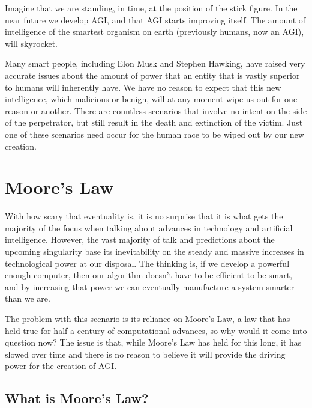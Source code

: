 \documentclass[12pt]{article} %
\begin{document}
Imagine that we are standing, in time, at the position of the stick figure. In the near future we develop AGI, and that AGI starts improving itself. The amount of intelligence of the smartest organism on earth (previously humans, now an AGI), will skyrocket.

Many smart people, including Elon Musk and Stephen Hawking, have raised very accurate issues about the amount of power that an entity that is vastly superior to humans will inherently have. We have no reason to expect that this new intelligence, which malicious or benign, will at any moment wipe us out for one reason or another. There are countless scenarios that involve no intent on the side of the perpetrator, but still result in the death and extinction of the victim. Just one of these scenarios need occur for the human race to be wiped out by our new creation.



\section{Moore's Law}

With how scary that eventuality is, it is no surprise that it is what gets the majority of the focus when talking about advances in technology and artificial intelligence. However, the vast majority of talk and predictions about the upcoming singularity base its inevitability on the steady and massive increases in technological power at our disposal. The thinking is, if we develop a powerful enough computer, then our algorithm doesn't have to be efficient to be smart, and by increasing that power we can eventually manufacture a system smarter than we are.

The problem with this scenario is its reliance on Moore's Law, a law that has held true for half a century of computational advances, so why would it come into question now? The issue is that, while Moore's Law has held for this long, it has slowed over time and there is no reason to believe it will provide the driving power for the creation of AGI.


\subsection{What is Moore's Law?} %
\end{document}
